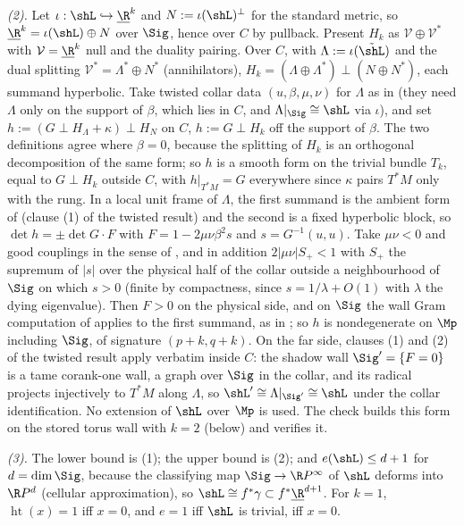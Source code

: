 \emph{(2).} Let $\iota : \shL \hookrightarrow \underline{\R}^{k}$ and $N := \iota(\shL)^{\perp}$ for the standard metric, so $\underline{\R}^{k} = \iota(\shL) \oplus N$ over $\Sig$, hence over $C$ by pullback. Present $H_k$ as $\mathcal V \oplus \mathcal V^{*}$ with $\mathcal V = \underline{\R}^{k}$ null and the duality pairing. Over $C$, with $\Lambda := \iota(\tilde\shL)$ and the dual splitting $\mathcal V^* = \Lambda^{*} \oplus N^{*}$ (annihilators), $H_k = (\Lambda \oplus \Lambda^{*}) \perp (N \oplus N^{*})$, each summand hyperbolic. Take twisted collar data $(u, \beta, \mu, \nu)$ for $\Lambda$ as in  (they need $\Lambda$ only on the support of $\beta$, which lies in $C$, and $\Lambda|_\Sig \cong \shL$ via $\iota$), and set $h := (G \perp H_\Lambda + \kappa) \perp H_N$ on $C$, $h := G \perp H_k$ off the support of $\beta$. The two definitions agree where $\beta = 0$, because the splitting of $H_k$ is an orthogonal decomposition of the same form; so $h$ is a smooth form on the trivial bundle $T_k$, equal to $G \perp H_k$ outside $C$, with $h|_{T^*M} = G$ everywhere since $\kappa$ pairs $T^*M$ only with the rung. In a local unit frame of $\Lambda$, the first summand is the ambient form of  (clause (1) of the twisted result) and the second is a fixed hyperbolic block, so $\det h = \pm \det G \cdot F$ with $F = 1 - 2\mu\nu\beta^{2}s$ and $s = G^{-1}(u,u)$. Take $\mu\nu < 0$ and good couplings in the sense of , and in addition $2|\mu\nu| S_+ < 1$ with $S_+$ the supremum of $|s|$ over the physical half of the collar outside a neighbourhood of $\Sig$ on which $s > 0$ (finite by compactness, since $s = 1/\lambda + O(1)$ with $\lambda$ the dying eigenvalue). Then $F > 0$ on the physical side, and on $\Sig$ the wall Gram computation of  applies to the first summand, as in ; so $h$ is nondegenerate on $\Mp$ including $\Sig$, of signature $(p{+}k, q{+}k)$. On the far side, clauses (1) and (2) of the twisted result apply verbatim inside $C$: the shadow wall $\Sig' = \{F = 0\}$ is a tame corank-one wall, a graph over $\Sig$ in the collar, and its radical projects injectively to $T^*M$ along $\Lambda$, so $\shL' \cong \Lambda|_{\Sig'} \cong \shL$ under the collar identification. No extension of $\shL$ over $\Mp$ is used. The check builds this form on the stored torus wall with $k = 2$ (below) and verifies it.

\emph{(3).} The lower bound is (1); the upper bound is (2); and $e(\shL) \leq d + 1$ for $d = \dim \Sig$, because the classifying map $\Sig \to \R P^{\infty}$ of $\shL$ deforms into $\R P^{d}$ (cellular approximation), so $\shL \cong f^{*}\gamma \subset f^{*}\underline{\R}^{d+1}$. For $k = 1$, $\operatorname{ht}(x) = 1$ iff $x = 0$, and $e = 1$ iff $\shL$ is trivial, iff $x = 0$.

